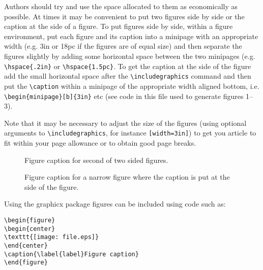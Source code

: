\documentclass[a4paper]{jpconf}
\begin{document}
Authors should try and use the space allocated to them as economically as possible. At times it may be convenient to put two figures side by side or the caption at the side of a figure. To put figures side by side, within a figure environment, put each figure and its caption into a minipage with an appropriate width (e.g. 3in or 18pc if the figures are of equal size) and then separate the figures slightly by adding some horizontal space between the two minipages (e.g. \verb"\hspace{.2in}" or \verb"\hspace{1.5pc}". To get the caption at the side of the figure add the small horizontal space after the \verb"\includegraphics" command and then put the \verb"\caption" within a minipage of the appropriate width aligned bottom, i.e. \verb"\begin{minipage}[b]{3in}" etc (see code in this file used to generate figures 1--3).

Note that it may be necessary to adjust the size of the figures (using optional arguments to \verb"\includegraphics", for instance \verb"[width=3in]") to get you article to fit within your page allowance or to obtain good page breaks.

\begin{figure}[h]
\begin{minipage}{14pc}
\caption{\label{label}Figure caption for first of two sided figures.}
\end{minipage}\hspace{2pc}%
\begin{minipage}{14pc}
\caption{\label{label}Figure caption for second of two sided figures.}
\end{minipage} 
\end{figure}

\begin{figure}[h]
\begin{minipage}[b]{14pc}\caption{\label{label}Figure caption for a narrow figure where the caption is put at the side of the figure.}
\end{minipage}
\end{figure}

Using the graphicx package figures can be included using code such as:
\begin{verbatim}
\begin{figure}
\begin{center}
\texttt{[image: file.eps]}
\end{center}
\caption{\label{label}Figure caption}
\end{figure}
\end{verbatim}
\end{document}
